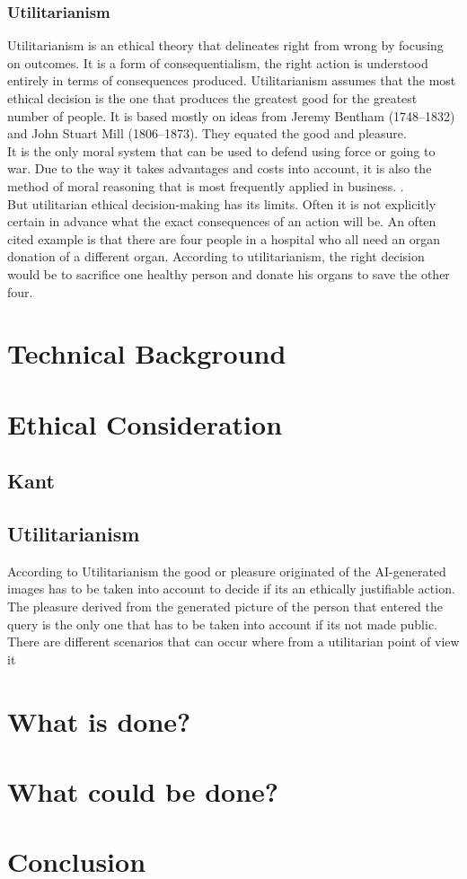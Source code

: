 \documentclass[11pt]{article}
\begin{document}
\subsubsection{Utilitarianism}
Utilitarianism is an ethical theory that delineates right from wrong by focusing on outcomes. It is a form of consequentialism, the right action is understood entirely in terms of consequences produced.
Utilitarianism assumes that the most ethical decision is the one that produces the greatest good for the greatest number of people. It is based mostly on ideas from Jeremy Bentham (1748--1832) and John Stuart Mill (1806--1873). They  equated the good and pleasure.\\
It is the only moral system that can be used to defend using force or going to war. Due to the way it takes advantages and costs into account, it is also the method of moral reasoning that is most frequently applied in business. \cite{EthicsUnwrapped}. \\
But utilitarian ethical decision-making has its limits. Often it is not explicitly certain in advance what the exact consequences of an action will be. 
An often cited example is that there are four people in a hospital who all need an organ donation of a different organ. According to utilitarianism, the right decision would be to sacrifice one healthy person and donate his organs to save the other four.

\section{Technical Background}

\section{Ethical Consideration}
\subsection{Kant}
\subsection{Utilitarianism}
According to Utilitarianism the good or pleasure originated of the AI-generated images has to be taken into account to decide if its an ethically justifiable action. \\
The pleasure derived from the generated picture of the person that entered the query is the only one that has to be taken into account if its not made public. 
There are different scenarios that can occur where from a utilitarian point of view it
\section{What is done?}
\section{What could be done?}
\section{Conclusion}



\end{document}
